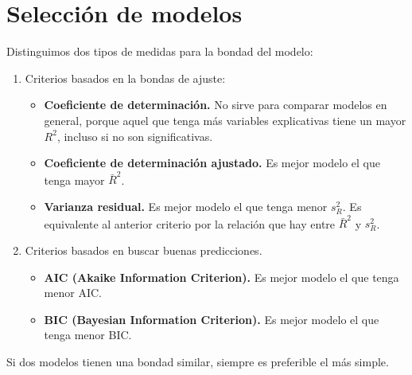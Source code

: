 \documentclass{report}
\theoremstyle{remark}
\theoremstyle{remark}
\theoremstyle{remark}
\theoremstyle{definition}
\theoremstyle{definition}
\theoremstyle{definition}
\begin{document}
\section{Selección de modelos}
Distinguimos dos tipos de medidas para la bondad del modelo:
\begin{enumerate}
    \item Criterios basados en la bondas de ajuste:
          \begin{itemize}
              \item \textbf{Coeficiente de determinación.}
                    No sirve para comparar modelos en general, porque aquel que tenga más variables explicativas tiene un mayor $R^2$, incluso si no son significativas.
              \item \textbf{Coeficiente de determinación ajustado.}
                    Es mejor modelo el que tenga mayor $\bar{R}^2$.
              \item \textbf{Varianza residual.}
                    Es mejor modelo el que tenga menor $s_R^2$.
                    Es equivalente al anterior criterio por la relación que hay entre $\bar{R}^2$ y $s_R^2$.
          \end{itemize}
    \item Criterios basados en buscar buenas predicciones.
          \begin{itemize}
              \item \textbf{AIC (Akaike Information Criterion).}
                    Es mejor modelo el que tenga menor AIC.
              \item \textbf{BIC (Bayesian Information Criterion).}
                    Es mejor modelo el que tenga menor BIC.
          \end{itemize}
\end{enumerate}

Si dos modelos tienen una bondad similar, siempre es preferible el más simple.
\end{document}
